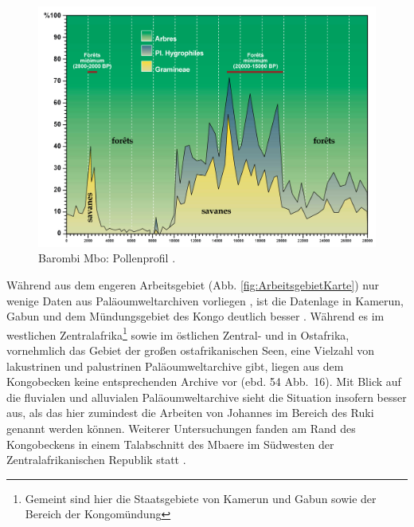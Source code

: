 \begin{figure}[p]
	\centering
\begin{minipage}{.55\textwidth}
	\includegraphics[width=\textwidth]{bib/Maley2001/6Abb1.jpg}
	\caption{Barombi Mbo: Pollenprofil \parencite[6 Abb. 1]{Maley.2001}.}
	\label{fig:BarombiMbo_Pollenprof}
\end{minipage}
\end{figure}

Während aus dem engeren Arbeitsgebiet (Abb. \ref{fig:ArbeitsgebietKarte}) nur wenige Daten aus Paläoumweltarchiven vorliegen \parencites{Brncic.2007}{Brncic.2009}{Kiahtipes.2011}{Kiahtipes.2016}, ist die Datenlage in Kamerun, Gabun und dem Mündungsgebiet des Kongo deutlich besser \parencite[siehe][41--58; Abb.~\ref{fig:PalaeoumweltArch_Karte}]{Sangen.2009}. Während es im westlichen Zentralafrika\footnote{Gemeint sind hier die Staatsgebiete von Kamerun und Gabun sowie der Bereich der Kongomündung} sowie im östlichen Zentral- und in Ostafrika, vornehmlich das Gebiet der großen ostafrikanischen Seen, eine Vielzahl von lakustrinen und palustrinen Paläoumweltarchive gibt, liegen aus dem Kongobecken keine entsprechenden Archive vor (ebd. 54 Abb.~16). Mit Blick auf die fluvialen und alluvialen Paläoumweltarchive sieht die Situation insofern besser aus, als das hier zumindest die Arbeiten von Johannes \textcites{Preu.1986}{Preu.1986b}{Preu.1990} im Bereich des Ruki genannt werden können. Weiterer Untersuchungen fanden am Rand des Kongobeckens in einem Talabschnitt des Mbaere im Südwesten der Zentralafrikanischen Republik statt \parencite{Neumer.2007}.

